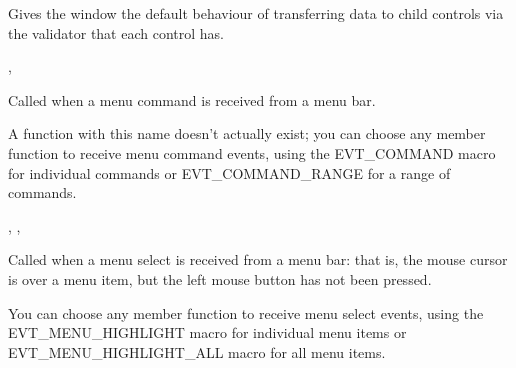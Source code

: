 


Gives the window the default behaviour of transferring data to child controls via
the validator that each control has.


, 

\label{wxwindowonmenucommand}


Called when a menu command is received from a menu bar.




A function with this name doesn't actually exist; you can choose any member function to receive
menu command events, using the EVT\_COMMAND macro for individual commands or EVT\_COMMAND\_RANGE for
a range of commands.


,\rtfsp
{},\rtfsp
{}

\label{wxwindowonmenuhighlight}


Called when a menu select is received from a menu bar: that is, the
mouse cursor is over a menu item, but the left mouse button has not been
pressed.




You can choose any member function to receive
menu select events, using the EVT\_MENU\_HIGHLIGHT macro for individual menu items or EVT\_MENU\_HIGHLIGHT\_ALL macro
for all menu items.

